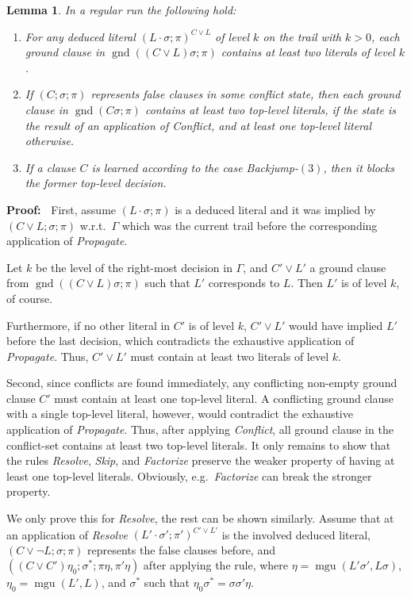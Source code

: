 \documentclass[a4paper]{article}
\newcommand{\mGnd}{\operatorname{gnd}} \newcommand{\mLVar}{\operatorname{lvar}} \newcommand{\mRVar}{\operatorname{rvar}} \newcommand{\mDmn}{\operatorname{dom}} \newcommand{\mRng}{\operatorname{rng}} \newcommand{\mMGU}{\operatorname{mgu}} \newcommand{\mDef}{\operatorname{def}} \newcommand{\mDomain}{\mathcal{D}} \newcommand{\mVar}{\operatorname{var}}
\newcommand{\startproof}{{\bf Proof:~}}
\newtheorem{lemm}[defi]{Lemma}
\begin{document}
\begin{lemm}\label{lemmRegProps} In a regular run the following hold:
  \begin{enumerate}[(1)]
		\item For any deduced literal $(L\cdot\sigma; \pi)^{C \lor L}$ of level $k$ on the trail with $k > 0$, each ground clause in $\mGnd((C \lor L)\sigma; \pi)$ contains at least two literals of level $k$.
		\item If $(C; \sigma; \pi)$ represents false clauses in some conflict state, then each ground clause in $\mGnd(C\sigma; \pi)$ contains at least two top-level literals, if 
		 the state is the result of an application of \emph{Conflict}, and at least one top-level literal otherwise.
		\item If a clause $C$ is learned according to the case \emph{Backjump}-$(3)$, then it blocks the former top-level decision.
  \end{enumerate}
\end{lemm}
\noindent
\startproof
First, assume $(L\cdot\sigma; \pi)$ is a deduced literal and it was implied by $(C\lor L; \sigma; \pi)$ w.r.t.\ 
$\Gamma$ which was the current trail before the corresponding application of \emph{Propagate}. 

Let $k$ be the level of the right-most decision in $\Gamma$, and $C' \lor L'$ a ground clause from $\mGnd((C\lor L)\sigma; \pi)$ 
such that $L'$ corresponds to $L$. 
Then $L'$ is of level $k$, of course. 

Furthermore, if no other literal in $C'$ is of level $k$, $C' \lor L'$ would have implied $L'$ 
before the last decision, which contradicts the exhaustive application of \emph{Propagate}.
Thus, $C' \lor L'$ must contain at least two literals of level $k$.

Second, since conflicts are found immediately, any conflicting non-empty ground clause $C'$ must contain at least one top-level literal. 
A conflicting ground clause with a single top-level literal, however, would contradict the exhaustive application of \emph{Propagate}.
Thus, after applying \emph{Conflict}, all ground clause in the conflict-set contains at least two top-level literals. 
It only remains to show that the rules \emph{Resolve}, \emph{Skip}, and \emph{Factorize} 
preserve the weaker property of having at least one top-level literals. Obviously, e.g.\ \emph{Factorize} can break the stronger property.

We only prove this for \emph{Resolve}, the rest can be shown similarly. 
Assume that at an application of \emph{Resolve} $(L'\cdot\sigma'; \pi')^{C'\lor L'}$  is the involved deduced literal, 
$(C \lor \neg L; \sigma; \pi)$ represents the false clauses before, and
$((C \lor C')\eta_0; \sigma^*; \pi\eta, \pi'\eta)$ after applying the rule, where 
$\eta = \mMGU(L'\sigma', L\sigma)$,
$\eta_0 = \mMGU(L', L)$, and $\sigma^*$ such that $\eta_0\sigma^* = \sigma\sigma'\eta$.
\end{document}
